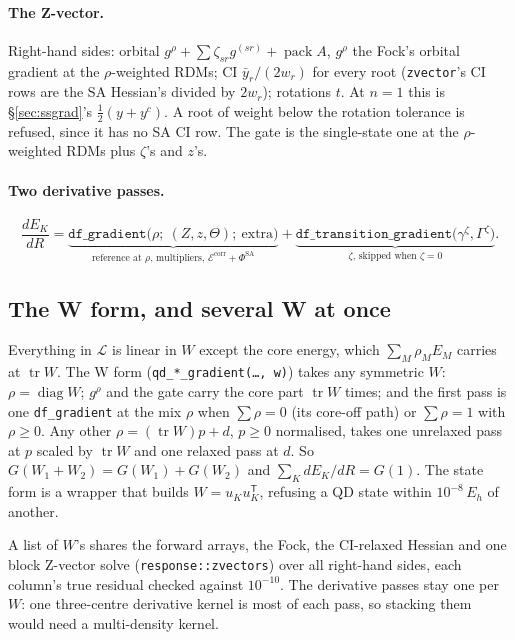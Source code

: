 \documentclass[11pt]{article}
\newcommand{\code}[1]{\texttt{#1}}
\newcommand{\T}{\mathsf T}
\newcommand{\tr}{\operatorname{tr}}
\begin{document}
\paragraph{The Z-vector.} Right-hand sides: orbital
$g^\rho + \sum\zeta_{sr}g^{(sr)} + \operatorname{pack}A$, $g^\rho$ the Fock's
orbital gradient at the $\rho$-weighted RDMs; CI $\bar y_r/(2w_r)$ for every
root (\code{zvector}'s CI rows are the SA Hessian's divided by $2w_r$);
rotations $t$. At $n = 1$ this is \S\ref{sec:ssgrad}'s $\tfrac12(y + y^c)$.
A root of weight below the rotation tolerance is refused, since it has no SA
CI row. The gate is the single-state one at the $\rho$-weighted RDMs plus
$\zeta$'s and $z$'s.

\paragraph{Two derivative passes.}
\begin{equation}
  \frac{dE_K}{dR} = \underbrace{\code{df\_gradient}\bigl(\rho;\ (Z,z,\Theta);\ \text{extra}\bigr)}_{\text{reference at }\rho\text{, multipliers, }\mathcal E^{\mathrm{corr}}+\Phi^{\mathrm{SA}}}
  + \underbrace{\code{df\_transition\_gradient}\bigl(\gamma^\zeta, \Gamma^\zeta\bigr)}_{\zeta\text{, skipped when }\zeta = 0}.
\end{equation}

\subsection{The W form, and several W at once}

Everything in $\mathcal L$ is linear in $W$ except the core energy, which
$\sum_M\rho_M E_M$ carries at $\tr W$. The W form (\code{qd\_*\_gradient(\ldots, w)})
takes any symmetric $W$: $\rho = \operatorname{diag}W$; $g^\rho$ and the gate
carry the core part $\tr W$ times; and the first pass is one
\code{df\_gradient} at the mix $\rho$ when $\sum\rho = 0$ (its core-off
path) or $\sum\rho = 1$ with $\rho\ge 0$. Any other $\rho = (\tr W)p + d$,
$p\ge 0$ normalised, takes one unrelaxed pass at $p$ scaled by $\tr W$ and
one relaxed pass at $d$. So $G(W_1 + W_2) = G(W_1) + G(W_2)$ and
$\sum_K dE_K/dR = G(1)$. The state form is a wrapper that builds
$W = u_Ku_K^\T$, refusing a QD state within $10^{-8}\,E_h$ of another.

A list of $W$'s shares the forward arrays, the Fock, the CI-relaxed Hessian
and one block Z-vector solve (\code{response::zvectors}) over all right-hand
sides, each column's true residual checked against $10^{-10}$. The
derivative passes stay one per $W$: one three-centre derivative kernel is
most of each pass, so stacking them would need a multi-density kernel.
\end{document}
